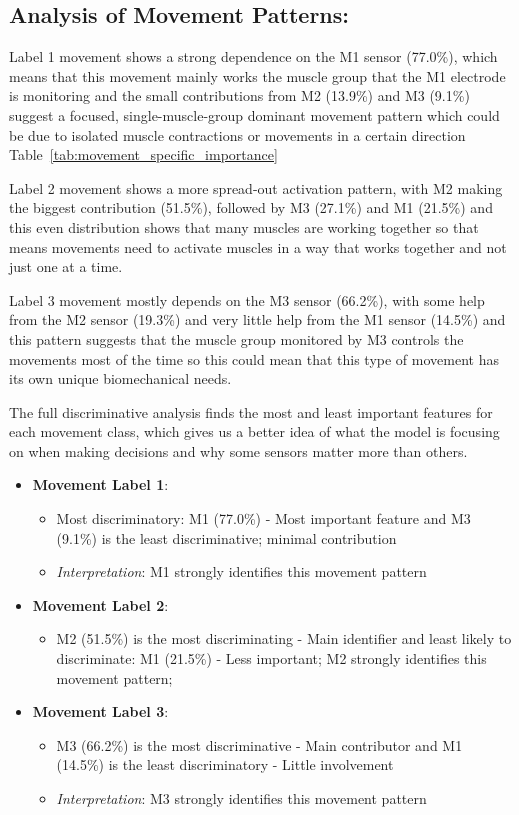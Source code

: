 \documentclass{elektr}
\begin{document}

\subsection{Analysis of Movement Patterns:}

Label 1 movement shows a strong dependence on the M1 sensor (77.0\%), which means that this movement mainly works the muscle group that the M1 electrode is monitoring and the small contributions from M2 (13.9\%) and M3 (9.1\%) suggest a focused, single-muscle-group dominant movement pattern which could be due to isolated muscle contractions or movements in a certain direction Table~\ref{tab:movement_specific_importance}\

Label 2 movement shows a more spread-out activation pattern, with M2 making the biggest contribution (51.5\%), followed by M3 (27.1\%) and M1 (21.5\%) and this even distribution shows that many muscles are working together so that means movements need to activate muscles in a way that works together and not just one at a time.

Label 3 movement mostly depends on the M3 sensor (66.2\%), with some help from the M2 sensor (19.3\%) and very little help from the M1 sensor (14.5\%) and this pattern suggests that the muscle group monitored by M3 controls the movements most of the time so this could mean that this type of movement has its own unique biomechanical needs.

The full discriminative analysis finds the most and least important features for each movement class, which gives us a better idea of what the model is focusing on when making decisions and why some sensors matter more than others.

\begin{itemize}
	\item \textbf{Movement Label 1}:
	\begin{itemize}
		\item Most discriminatory: M1 (77.0\%) - Most important feature and M3 (9.1\%) is the least discriminative; minimal contribution
		\item \textit{Interpretation}: M1 strongly identifies this movement pattern
	\end{itemize}
	
	\item \textbf{Movement Label 2}:
	\begin{itemize}
		\item M2 (51.5\%) is the most discriminating - Main identifier and least likely to discriminate: M1 (21.5\%) - Less important; M2 strongly identifies this movement pattern;
	\end{itemize}
	
	\item \textbf{Movement Label 3}:
	\begin{itemize}
		\item M3 (66.2\%) is the most discriminative - Main contributor and M1 (14.5\%) is the least discriminatory - Little involvement
		\item \textit{Interpretation}: M3 strongly identifies this movement pattern
	\end{itemize}
\end{itemize}
\end{document}
